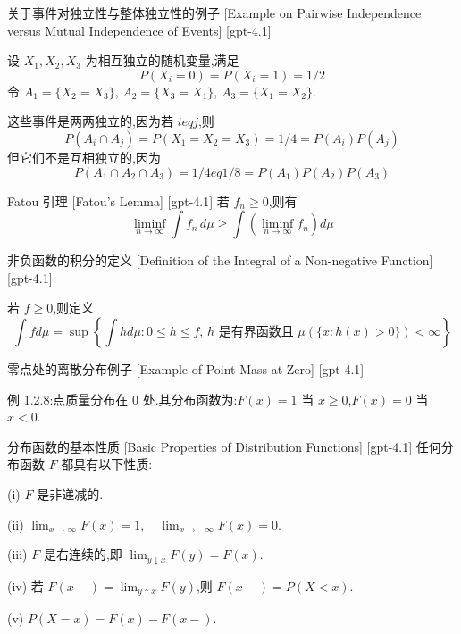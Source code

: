 \documentclass[UTF8]{ctexart}
\begin{document}
    \begin{xmp}
        {关于事件对独立性与整体独立性的例子}
        [Example on Pairwise Independence versus Mutual Independence of Events]
        [gpt-4.1]
        
设 $X_1, X_2, X_3$ 为相互独立的随机变量,满足
\[
P(X_i = 0) = P(X_i = 1) = 1/2
\]
令 $A_1 = \{ X_2 = X_3 \}$, $A_2 = \{ X_3 = X_1 \}$, $A_3 = \{ X_1 = X_2 \}$.

这些事件是两两独立的,因为若 $i 
eq j$,则
\[
P(A_i \cap A_j) = P(X_1 = X_2 = X_3) = 1/4 = P(A_i) P(A_j)
\]
但它们不是互相独立的,因为
\[
P(A_1 \cap A_2 \cap A_3) = 1/4 
eq 1/8 = P(A_1) P(A_2) P(A_3)
\]

    \end{xmp}
    
    
    
    \begin{thm}
        {Fatou 引理}
        [Fatou's Lemma]
        [gpt-4.1]
        若 $f_{n} \geq 0$,则有
\[
\liminf_{n \to \infty} \int f_{n} \, d\mu \geq \int \left( \liminf_{n \to \infty} f_{n} \right) d\mu
\]

    \end{thm}
    
    
    
    \begin{dfn}
        {非负函数的积分的定义}
        [Definition of the Integral of a Non-negative Function]
        [gpt-4.1]
        
若 $f \geq 0$,则定义
\[
\int f d \mu = \operatorname*{sup} \left\{ \int h d \mu : 0 \leq h \leq f,\, h \text{ 是有界函数且 } \mu ( \{ x : h ( x ) > 0 \} ) < \infty \right\}
\]

    \end{dfn}
    
    
    
    \begin{xmp}
        {零点处的离散分布例子}
        [Example of Point Mass at Zero]
        [gpt-4.1]
        
例 1.2.8:点质量分布在 $0$ 处.其分布函数为:$F(x) = 1$ 当 $x \geq 0$,$F(x) = 0$ 当 $x < 0$.

    \end{xmp}
    
    
    
    \begin{ppt}
        {分布函数的基本性质}
        [Basic Properties of Distribution Functions]
        [gpt-4.1]
        任何分布函数 $F$ 都具有以下性质:

(i) $F$ 是非递减的.

(ii) $\lim_{x \to \infty} F(x) = 1, \quad \lim_{x \to -\infty} F(x) = 0$.

(iii) $F$ 是右连续的,即 $\lim_{y \downarrow x} F(y) = F(x)$.

(iv) 若 $F(x-) = \lim_{y \uparrow x} F(y)$,则 $F(x-) = P(X < x)$.

(v) $P(X = x) = F(x) - F(x-)$.

    \end{ppt}
    
\end{document}
